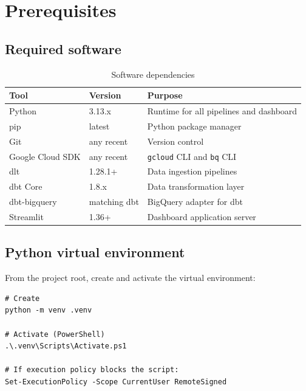 \documentclass[11pt,a4paper]{article}
\begin{document}
\section{Prerequisites}

\subsection{Required software}

\begin{table}[h!]
\centering
\caption{Software dependencies}
\small
{}
\begin{tabularx}{\textwidth}{@{}llX@{}}
\toprule
\textbf{Tool} & \textbf{Version} & \textbf{Purpose} \\
\midrule
Python           & 3.13.x          & Runtime for all pipelines and dashboard \\
pip              & latest          & Python package manager \\
Git              & any recent      & Version control \\
Google Cloud SDK & any recent      & \texttt{gcloud} CLI and \texttt{bq} CLI \\
dlt              & 1.28.1+         & Data ingestion pipelines \\
dbt Core         & 1.8.x           & Data transformation layer \\
dbt-bigquery     & matching dbt    & BigQuery adapter for dbt \\
Streamlit        & 1.36+           & Dashboard application server \\
\bottomrule
\end{tabularx}
\end{table}

\subsection{Python virtual environment}

From the project root, create and activate the virtual environment:

\begin{lstlisting}[style=shell]
# Create
python -m venv .venv

# Activate (PowerShell)
.\.venv\Scripts\Activate.ps1

# If execution policy blocks the script:
Set-ExecutionPolicy -Scope CurrentUser RemoteSigned
\end{lstlisting}
\end{document}
